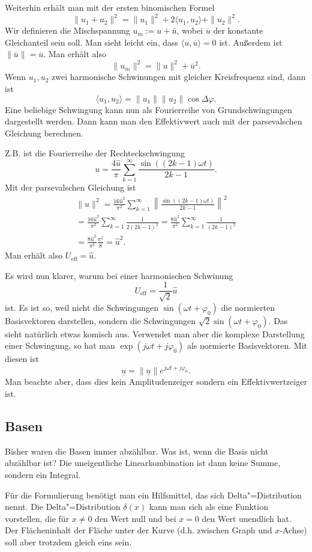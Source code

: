 \documentclass[a4paper,10pt,fleqn,twocolumn,twoside]{article}
\begin{document}
Weiterhin erhält man mit der ersten binomischen Formel
\[\|u_1+u_2\|^2 = \|u_1\|^2+2\langle u_1,u_2\rangle+\|u_2\|^2.\]
Wir definieren die Mischspannung \(u_m := u+\overline u\),
wobei \(\overline u\) der konstante Gleichanteil sein soll. Man sieht
leicht ein, dass \(\langle u,\overline u\rangle=0\) ist.
Außerdem ist \(\|\overline u\|=\overline u\). Man erhält also
\[\|u_m\|^2 = \|u\|^2+\overline u^2.\]
Wenn \(u_1,u_2\) zwei harmonische Schwinungen mit gleicher
Kreisfrequenz sind, dann ist
\[\langle u_1,u_2\rangle = \|u_1\|\|u_2\|\cos\Delta\varphi.\]
Eine beliebige Schwingung kann nun als Fourierreihe von
Grundschwingungen dargestellt werden. Dann kann man den Effektivwert
auch mit der parsevalschen Gleichung berechnen.

Z.B. ist die Fourierreihe der Rechteckschwingung
\[u = \frac{4\hat u}{\pi} \sum_{k=1}^{\infty}
\frac{\sin((2k-1)\omega t)}{2k-1}.\]
Mit der parsevalschen Gleichung ist
\begin{gather*}
\|u\|^2 = \frac{16\hat u^2}{\pi^2} \sum_{k=1}^{\infty}
\left\|\frac{\sin((2k-1)\omega t)}{2k-1}\right\|^2\\
= \frac{16\hat u^2}{\pi^2} \sum_{k=1}^{\infty} \frac{1}{2(2k-1)^2}
= \frac{8\hat u^2}{\pi^2} \sum_{k=1}^{\infty} \frac{1}{(2k-1)^2}\\
= \frac{8\hat u^2}{\pi^2} \frac{\pi^2}{8} = \hat u^2.
\end{gather*}
Man erhält also \(U_\mathrm{eff}=\hat u\).

Es wird nun klarer, warum bei einer harmonischen Schwinung
\[U_\mathrm{eff}=\frac{1}{\sqrt{2}}\hat u\]
ist. Es ist so, weil nicht die Schwingungen
\(\sin(\omega t+\varphi_0)\) die normierten Basisvektoren darstellen,
sondern die Schwingungen \(\sqrt{2}\sin(\omega t+\varphi_0)\). Das
sieht natürlich etwas komisch aus. Verwendet man aber die komplexe
Darstellung einer Schwingung, so hat man
\(\exp(j\omega t+j\varphi_0)\) als normierte Basisvektoren.
Mit diesen ist
\[\underline u = \|\underline u\|e^{j\omega t+j\varphi_0}.\]
Man beachte aber, dass dies kein Amplitudenzeiger sondern ein
Effektivwertzeiger ist.

\subsection{Basen}

Bisher waren die Basen immer abzählbar. Was ist, wenn die Basis nicht
abzählbar ist? Die uneigentliche Linearkombination ist dann keine
Summe, sondern ein Integral.

Für die Formulierung benötigt man ein Hilfsmittel, das sich
Delta"=Distribution nennt. Die Delta"=Distribution \(\delta(x)\) kann man
sich als eine Funktion vorstellen, die für \(x\ne 0\) den Wert null
und bei \(x=0\) den Wert unendlich hat. Der Flächeninhalt der Fläche
unter der Kurve (d.h. zwischen Graph und \(x\)-Achse) soll aber
trotzdem gleich eins sein.
\end{document}
